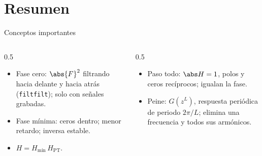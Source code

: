\documentclass[aspectratio=169,11pt]{beamer}
\begin{document}
\section*{Resumen}
\begin{frame}{Conceptos importantes}
  \begin{columns}[T]
    \begin{column}{0.5\textwidth}
      \begin{itemize}
        \item Fase cero: $\abs{F}^2$ filtrando hacia delante y hacia atrás (\texttt{filtfilt}); solo con señales grabadas.
        \item Fase mínima: ceros dentro; menor retardo; inversa estable.
        \item $H=H_{\min}\,H_{\text{PT}}$.
      \end{itemize}
    \end{column}
    \begin{column}{0.5\textwidth}
      \begin{itemize}
        \item Paso todo: $\abs H=1$, polos y ceros recíprocos; igualan la fase.
        \item Peine: $G(z^L)$, respuesta periódica de periodo $2\pi/L$; elimina una frecuencia y todos sus armónicos.
      \end{itemize}
    \end{column}
  \end{columns}
  \bigskip
\end{frame}
\end{document}
